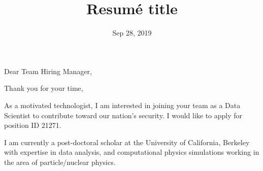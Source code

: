 \documentclass[11pt,letterpaper,sans]{moderncv}        %
\title{Resumé title}                               %
\begin{document}
\date{Sep 28, 2019}
\opening{Dear Team Hiring Manager,}
\closing{Thank you for your time,}
\makelettertitle

As a motivated technologist, I am interested in joining your team as a Data
Scientist to contribute toward our nation's security. I would like to apply for
position ID 21271.

I am currently a post-doctoral scholar at the University of California,
Berkeley with expertise in data analysis, and computational physics
simulations working in the area of particle/nuclear physics.


\end{document}
